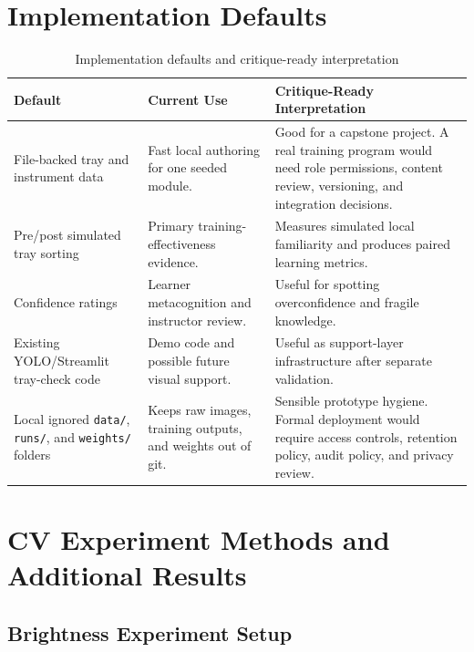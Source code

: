 \documentclass[10pt,a4paper]{article}
\begin{document}
\section{Implementation Defaults}
\label{sec:appendix-b-implementation-defaults}

\begin{table}[H]
\centering
\caption{Implementation defaults and critique-ready interpretation}
\label{tab:implementation-defaults-and-critique-ready-interpretation}
\small\renewcommand{\arraystretch}{1.2}\setlength{\tabcolsep}{4pt}
\begin{tabularx}{\textwidth}{|>{\raggedright\arraybackslash}X|>{\raggedright\arraybackslash}X|>{\raggedright\arraybackslash}X|}
\hline
Default & Current Use & Critique-Ready Interpretation \\
\hline
File-backed tray and instrument data & Fast local authoring for one seeded module. & Good for a capstone project. A real training program would need role permissions, content review, versioning, and integration decisions. \\
\hline
Pre/post simulated tray sorting & Primary training-effectiveness evidence. & Measures simulated local familiarity and produces paired learning metrics. \\
\hline
Confidence ratings & Learner metacognition and instructor review. & Useful for spotting overconfidence and fragile knowledge. \\
\hline
Existing YOLO/Streamlit tray-check code & Demo code and possible future visual support. & Useful as support-layer infrastructure after separate validation. \\
\hline
Local ignored \texttt{data/}, \texttt{runs/}, and \texttt{weights/} folders & Keeps raw images, training outputs, and weights out of git. & Sensible prototype hygiene. Formal deployment would require access controls, retention policy, audit policy, and privacy review. \\
\hline
\end{tabularx}
\end{table}

\section{CV Experiment Methods and Additional Results}
\label{sec:appendix-c-cv-experiment-methods}

\subsection{Brightness Experiment Setup}
\end{document}
